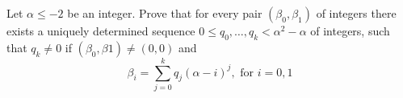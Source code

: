 Let $\alpha \leq -2$ be an integer. Prove that for every pair $(\beta_0, \beta_1)$ of integers there exists a uniquely determined sequence $0\leq q_0, \ldots, q_k<\alpha ^ 2 - \alpha$ of integers, such that $q_k\neq 0$ if $(\beta_0, \beta 1)\neq (0,0)$ and
$$\beta_i=\sum_{j=0}^k q_j(\alpha - i)^j,\text{   for }i=0,1$$
